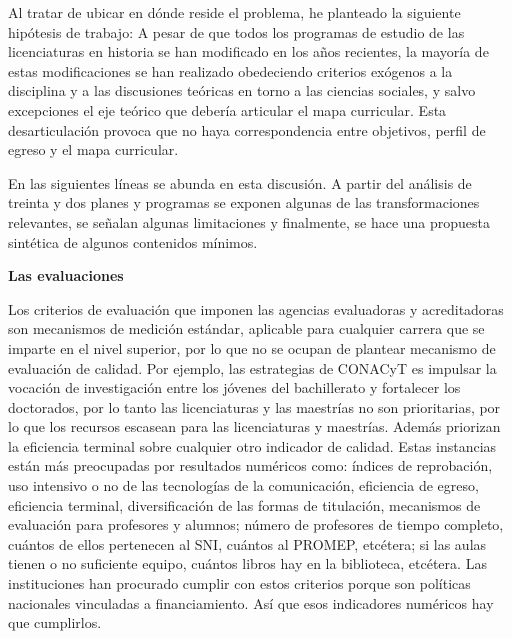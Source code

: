 Al tratar de ubicar en dónde reside el problema, he planteado la 
siguiente hipótesis de trabajo: A pesar de que todos los programas de 
estudio de las licenciaturas en historia se han modificado en los años 
recientes, la mayoría de estas modificaciones se han realizado 
obedeciendo criterios exógenos a la disciplina y a las discusiones 
teóricas en torno a las ciencias sociales, y salvo excepciones el eje 
teórico que debería articular el mapa curricular. Esta desarticulación 
provoca que no haya correspondencia entre objetivos, perfil de egreso y 
el mapa curricular. 

En las siguientes líneas se abunda en esta discusión. A partir del 
análisis de treinta y dos planes y programas se exponen algunas de las 
transformaciones relevantes, se señalan algunas limitaciones y 
finalmente, se hace una propuesta sintética de algunos contenidos 
mínimos. 

\textbf{Las evaluaciones}

Los criterios de evaluación que imponen las agencias evaluadoras y 
acreditadoras son mecanismos de medición estándar, aplicable para 
cualquier carrera que se imparte en el nivel superior, por lo que no se 
ocupan de plantear mecanismo de evaluación de calidad. Por ejemplo, las 
estrategias de CONACyT es impulsar la vocación de investigación entre 
los jóvenes del bachillerato y fortalecer los doctorados, por lo tanto 
las licenciaturas y las maestrías no son prioritarias, por lo que los 
recursos escasean para las licenciaturas y maestrías. Además priorizan 
la eficiencia terminal sobre cualquier otro indicador de calidad. Estas 
instancias están más preocupadas por resultados numéricos como: índices 
de reprobación, uso intensivo o no de las tecnologías de la 
comunicación,  eficiencia de egreso, eficiencia terminal, 
diversificación de las formas de titulación, mecanismos de evaluación 
para profesores y alumnos; número de profesores de tiempo completo, 
cuántos de ellos pertenecen al SNI, cuántos al PROMEP, etcétera; si las 
aulas tienen o no suficiente equipo, cuántos libros hay en la 
biblioteca, etcétera. Las instituciones han procurado cumplir con estos 
criterios porque son políticas nacionales vinculadas a financiamiento. 
Así que esos indicadores numéricos hay que cumplirlos.

